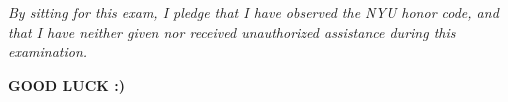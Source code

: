 \documentclass[10pt, addpoints]{exam}
\theoremstyle{definition}
\renewcommand\arraystretch{2}
\renewcommand\arraystretch{2}
\begin{document}
\begin{titlepage}
\begin{itemize}
\end{itemize}

\vspace{0.3in}


\vfill
\begin{center}
\emph{By sitting for this exam, I pledge that I have observed the NYU honor code, and that I have neither given nor
received unauthorized assistance during this examination.}
\end{center}


\begin{center}
 {\large \bf GOOD LUCK :)}
\end{center}

\end{titlepage}

\pointsinrightmargin
\renewcommand\arraystretch{1}
\end{document}
